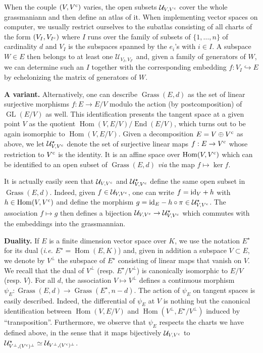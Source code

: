 \documentclass{sig-alternate}
\DeclareMathOperator{\Hom}{Hom}
\DeclareMathOperator{\End}{End}
\DeclareMathOperator{\GL}{GL}
\DeclareMathOperator{\Grass}{Grass}
\begin{document}
When the couple $(V, V^{\text{\rm c}})$ varies, the open subsets $\mathcal 
U_{V,V^{\text{\rm c}}}$ cover the whole grassmaniann and then define an atlas 
of it. When implementing vector spaces on computer, we usually restrict 
ourselves to the subatlas consisting of all charts of the form $(V_I, 
V_{I^{\text{\rm c}}})$ where $I$ runs over the family of subsets of $\{1, 
\ldots, n\}$ of cardinality $d$ and $V_I$ is the subspaces spanned by 
the $e_i$'s with $i \in I$. A subspace $W \in E$ then belongs to at 
least one $\mathcal U_{V_I, V_{I^{\text{c}}}}$ and, given a family of
generators of $W$, we can determine such an $I$ together with the
corresponding embedding $f : V_I \hookrightarrow E$ by echelonizing 
the matrix of generators of $W$.

\medskip

\noindent
{\bf A variant.}
Alternatively, one can describe $\Grass(E,d)$ as the set of linear 
surjective morphisms $f : E \to E/V$ modulo the action (by 
postcomposition) of $\GL(E/V)$ as well. This identification presents the 
tangent space at a given point $V$ as the quotient $\Hom(V, E/V) / 
\End(E/V)$, which turns out to be again isomorphic to $\Hom(V, E/V)$. 
Given a decomposition $E = V \oplus V^{\text{\rm c}}$ as above, we let $\mathcal 
U^\star_{V, V^{\text{\rm c}}}$ denote the set of surjective linear maps $f : E 
\to V^{\text{\rm c}}$ whose restriction to $V^{\text{\rm c}}$ is the identity. It is an 
affine space over $\Hom(V, V^\c)$ which can be identified to an open
subset of $\Grass(E,d)$ \emph{via} the map $f \mapsto \ker f$.

It is actually easily seen that $\mathcal U_{V, V^{\text{\rm c}}}$ and $\mathcal 
U^\star_{V, V^{\text{\rm c}}}$ define the same open subset in $\Grass(E,d)$. 
Indeed, given $f \in \mathcal U_{V, V^{\text{\rm c}}}$, one can write $f = \textrm{id}_V 
+ h$ with $h \in \Hom(V, V^\c)$ and define the morphism $g = \textrm{id}_E -
h \circ \pi \in \mathcal U^\star_{V, V^{\text{\rm c}}}$. The association $f \mapsto
g$ then defines a bijection $\mathcal U_{V, V^{\text{\rm c}}} \to \mathcal
U^\star_{V, V^{\text{\rm c}}}$ which commutes with the embeddings into the
grassmannian.

\medskip

\noindent
{\bf Duality.}
If $E$ is a finite dimension vector space over $K$, we use the notation 
$E^\star$ for its dual (\emph{i.e.} $E^\star = \Hom(E,K)$) and, given in 
addition a subspace $V \subset E$, we denote by $V^\perp$ the subspace 
of $E^\star$ consisting of linear maps that vanish on $V$. We recall
that the dual of $V^\perp$ (resp. $E^\star/V^\perp$) is canonically
isomorphic to $E/V$ (resp. $V$).
For all $d$, the association $V \mapsto V^\perp$ defines a continuous 
morphism $\psi_E : \Grass(E,d) \to \Grass(E^\star, n-d)$. The action of 
$\psi_E$ on tangent spaces is easily described. Indeed, the differential 
of $\psi_E$ at $V$ is nothing but the canonical identification between
$\Hom(V, E/V)$ and $\Hom(V^\perp, E^\star/V^\perp)$ induced by 
``transposition''. Furthermore, we observe that $\psi_E$ respects
the charts we have defined above, in the sense that it maps bijectively 
$\mathcal U_{V, V^{\text{\rm c}}}$ to $\mathcal U^\star_{V^\perp, (V^{\text{\rm c}})^\perp}
\simeq \mathcal U_{V^\perp, (V^{\text{\rm c}})^\perp}$.
\end{document}
